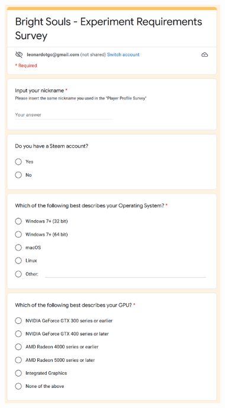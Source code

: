 \begin{figure}[!ht]
    \begin{center}
        \includegraphics[width=26em]{figures/fig-experiment-requirements-survey-pt1.png}
    \end{center}
\end{figure}

